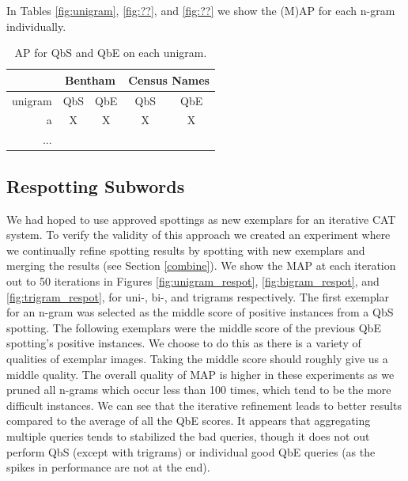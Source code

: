 \documentclass[ms,electronic,twosidetoc,letterpaper,chaptercenter,parttop,lol,lof,lot]{byumsphd}
\begin{document}
In Tables \ref{fig:unigram}, \ref{fig:??}, and \ref{fig:??} we show the (M)AP for each n-gram individually. 
\begin{table}
\centering
\begin{tabular}{| r | c c | c c |}
  \hline
  & \multicolumn{2}{c|}{Bentham} & \multicolumn{2}{c|}{Census Names}\\
  \hline
  unigram & QbS & QbE & QbS & QbE\\
  \hline 
  a & X & X  &   X & X\\
  ...\\
  \hline 
\end{tabular}
\caption{AP for QbS and QbE on each unigram.}
\label{tab:unigram}
\end{table}


\subsection{Respotting Subwords}

We had hoped to use approved spottings as new exemplars for an iterative CAT system. To verify the validity of this approach we created an experiment where we continually refine spotting results by spotting with new exemplars and merging the results (see Section \ref{combine}). We show the MAP at each iteration out to 50 iterations in Figures \ref{fig:unigram_respot}, \ref{fig:bigram_respot}, and \ref{fig:trigram_respot}, for uni-, bi-, and trigrams respectively. The first exemplar for an n-gram was selected as the middle score of positive instances from a QbS spotting. The following exemplars were the middle score of the previous QbE spotting's positive instances. We choose to do this as there is a variety of qualities of exemplar images. Taking the middle score should roughly give us a middle quality. The overall quality of MAP is higher in these experiments as we pruned all n-grams which occur less than 100 times, which tend to be the more difficult instances.
We can see that the iterative refinement leads to better results compared to the average of all the QbE scores. It appears that aggregating multiple queries tends to stabilized the bad queries, though it does not out perform QbS (except with trigrams) or individual good QbE queries (as the spikes in performance are not at the end).
\end{document}
